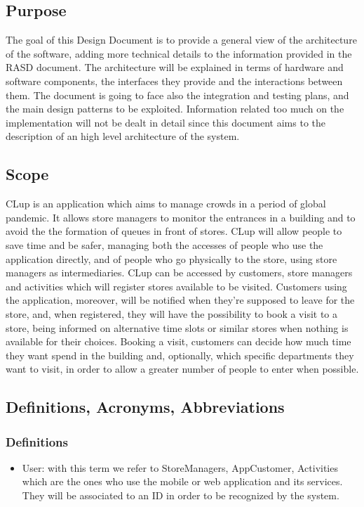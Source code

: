 \renewcommand{\thesubsection}{\Alph{subsection}}
     	\subsection{Purpose}
	The goal of this Design Document is to provide a general view of the architecture of the software, adding more technical details to the information provided in the RASD document. The architecture will be explained in terms of hardware and software components, the interfaces they provide and the interactions between them. The document is going to face also the integration and testing plans, and the main design patterns to be exploited. Information related too much on the implementation will not be dealt in detail since this document aims to the description of an high level architecture of the system. 
         \subsection{Scope}
         CLup is an application which aims to manage crowds in a period of global pandemic. It allows store managers to monitor the entrances in a building and to avoid the the formation of queues in front of stores. CLup will allow people to save time and be safer, managing both the accesses of people who use the application directly, and of people who go physically to the store, using store managers as intermediaries. CLup can be accessed by customers, store managers and activities which will register stores available to be visited. Customers using the application, moreover, will be notified when they're supposed to leave for the store, and, when registered, they will have the possibility to book a visit to a store, being informed on alternative time slots or similar stores when nothing is available for their choices.  Booking a visit, customers can decide how much time they want spend in the building and, optionally, which specific departments they want to visit, in order to allow a greater number of people to enter when possible.
         
         \subsection{Definitions, Acronyms, Abbreviations}
         	\subsubsection{Definitions}
		\begin{itemize}
			\item \textcolor{BrickRed}{User}: with this term we refer to StoreManagers, AppCustomer, Activities which are the ones who use the mobile or web application  and its services. They will be associated to an ID in order to be recognized by the system.
		\end{itemize}
		
